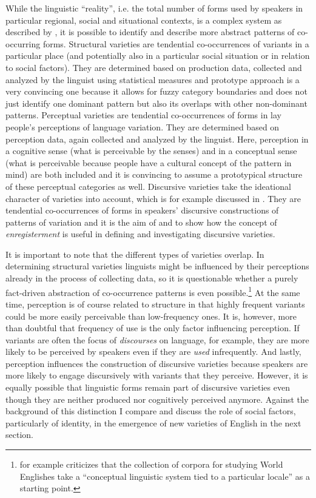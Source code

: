 While the linguistic “reality”, i.e. the total number of forms used by speakers in particular regional, social and situational contexts, is a complex system as described by \citet{ Kretzschmar2014, Kretzschmar2015, Kretzschmar2015b}, it is possible to identify and describe more abstract patterns of co-occurring forms. Structural varieties are tendential co-occurrences of variants in a particular place (and potentially also in a particular social situation or in relation to social factors). They are determined based on production data, collected and analyzed by the linguist using statistical measures and  prototype approach is a very convincing one because it allows for fuzzy category boundaries and does not just identify one dominant pattern but also its overlaps with other non-dominant patterns. Perceptual varieties are tendential co-occurrences of forms in lay people’s perceptions of language variation. They are determined based on perception data, again collected and analyzed by the linguist. Here, perception in a cognitive sense (what is perceivable by the senses) and in a conceptual sense (what is perceivable because people have a cultural concept of the pattern in mind) are both included and it is convincing to assume a prototypical structure of these perceptual categories as well. Discursive varieties take the ideational character of varieties into account, which is for example discussed in \citet{Kretzschmar2012}. They are tendential co-occurrences of forms in speakers’ discursive constructions of patterns of variation and it is the aim of  and  to show how the concept of \textit{enregisterment} is useful in defining and investigating discursive varieties.


It is important to note that the different types of varieties overlap. In determining structural varieties linguists might be influenced by their perceptions already in the process of collecting data, so it is questionable whether a purely fact-driven abstraction of co-occurrence patterns is even possible.\footnote{\citet[6]{Leimgruber2013b} for example criticizes that the collection of corpora for studying World Englishes take a “conceptual linguistic system tied to a particular locale” as a starting point.} At the same time, perception is of course related to structure in that highly frequent variants could be more easily perceivable than low-frequency ones. It is, however, more than doubtful that frequency of use is the only factor influencing perception. If variants are often the focus of \emph{discourses} on language, for example, they are more likely to be perceived by speakers even if they are \emph{used} infrequently. And lastly, perception influences the construction of discursive varieties because speakers are more likely to engage discursively with variants that they perceive. However, it is equally possible that linguistic forms remain part of discursive varieties even though they are neither produced nor cognitively perceived anymore. Against the background of this distinction I compare and discuss the role of social factors, particularly of identity, in the emergence of new varieties of English in the next section.

